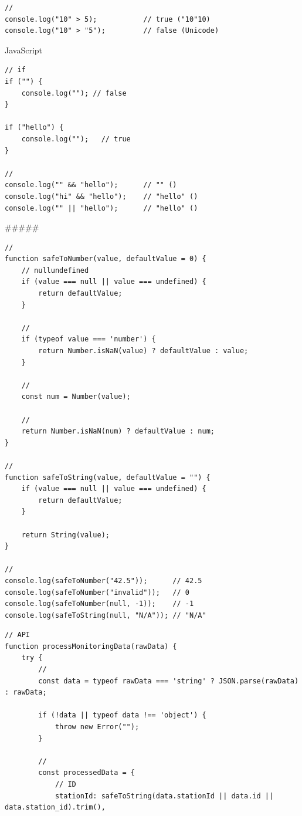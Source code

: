 {\begin{lstlisting}[style=javascript]
// 
console.log("10" > 5);           // true ("10"10)
console.log("10" > "5");         // false (Unicode)
\end{lstlisting}

\important{}

JavaScript

\begin{lstlisting}[style=javascript]
// if
if ("") {
    console.log(""); // false
}

if ("hello") {
    console.log("");   // true
}

// 
console.log("" && "hello");      // "" ()
console.log("hi" && "hello");    // "hello" ()
console.log("" || "hello");      // "hello" ()
\end{lstlisting}

##### 

\important{}

\begin{lstlisting}[style=javascript]
// 
function safeToNumber(value, defaultValue = 0) {
    // nullundefined
    if (value === null || value === undefined) {
        return defaultValue;
    }
    
    // 
    if (typeof value === 'number') {
        return Number.isNaN(value) ? defaultValue : value;
    }
    
    // 
    const num = Number(value);
    
    // 
    return Number.isNaN(num) ? defaultValue : num;
}

// 
function safeToString(value, defaultValue = "") {
    if (value === null || value === undefined) {
        return defaultValue;
    }
    
    return String(value);
}

// 
console.log(safeToNumber("42.5"));      // 42.5
console.log(safeToNumber("invalid"));   // 0
console.log(safeToNumber(null, -1));    // -1
console.log(safeToString(null, "N/A")); // "N/A"
\end{lstlisting}

\important{}

\begin{lstlisting}[style=javascript]
// API
function processMonitoringData(rawData) {
    try {
        // 
        const data = typeof rawData === 'string' ? JSON.parse(rawData) : rawData;
        
        if (!data || typeof data !== 'object') {
            throw new Error("");
        }
        
        // 
        const processedData = {
            // ID
            stationId: safeToString(data.stationId || data.id || data.station_id).trim(),
            

\end{lstlisting}}

